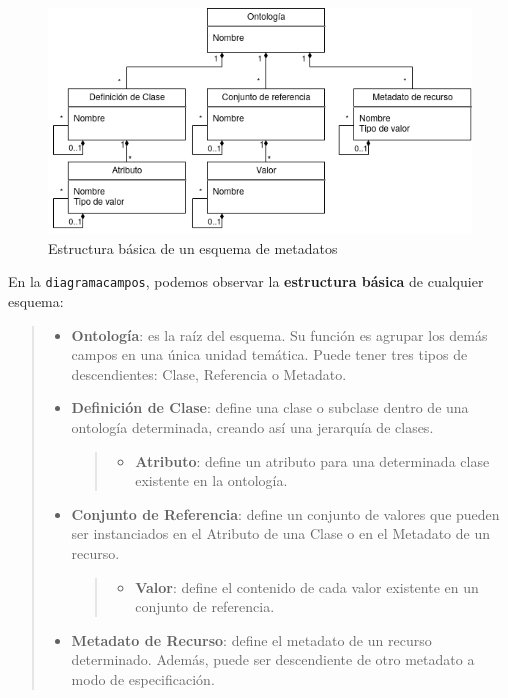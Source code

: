 \documentclass[
]{article}
\providecommand{\tightlist}{%
  \setlength{\itemsep}{0pt}\setlength{\parskip}{0pt}}
\begin{document}
\begin{figure}
\hypertarget{diagramacampos}{%
\centering
\includegraphics{../_static/images/diagramacampos.png}
\caption{Estructura básica de un esquema de
metadatos}\label{diagramacampos}
}
\end{figure}

En la \texttt{diagramacampos}, podemos observar la \textbf{estructura
básica} de cualquier esquema:

\begin{quote}
\begin{itemize}
\item
  \textbf{Ontología}: es la raíz del esquema. Su función es agrupar los
  demás campos en una única unidad temática. Puede tener tres tipos de
  descendientes: Clase, Referencia o Metadato.
\item
  \textbf{Definición de Clase}: define una clase o subclase dentro de
  una ontología determinada, creando así una jerarquía de clases.

  \begin{quote}
  \begin{itemize}
  \tightlist
  \item
    \textbf{Atributo}: define un atributo para una determinada clase
    existente en la ontología.
  \end{itemize}
  \end{quote}
\item
  \textbf{Conjunto de Referencia}: define un conjunto de valores que
  pueden ser instanciados en el Atributo de una Clase o en el Metadato
  de un recurso.

  \begin{quote}
  \begin{itemize}
  \tightlist
  \item
    \textbf{Valor}: define el contenido de cada valor existente en un
    conjunto de referencia.
  \end{itemize}
  \end{quote}
\item
  \textbf{Metadato de Recurso}: define el metadato de un recurso
  determinado. Además, puede ser descendiente de otro metadato a modo de
  especificación.
\end{itemize}
\end{quote}
\end{document}
